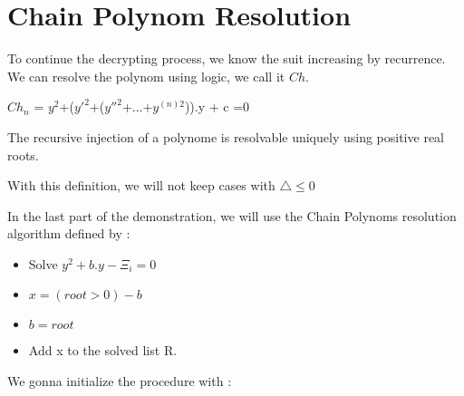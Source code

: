 \documentclass{article}
\begin{document}
\section*{Chain Polynom Resolution}

To continue the decrypting process, we know the suit increasing by recurrence.
We can resolve the polynom using logic, we call it $Ch$.

\begin{center}
	$Ch_{n}$ = $y^{2}$+($y'^{2}$+($y''^{2}$+...+$y^{(n)2}$)).y + c =0
\end{center}
The recursive injection of a polynome is resolvable uniquely using positive real roots.

With this definition, we will not keep cases with $\triangle \leq 0 $ 

In the last part of the demonstration, we will use the Chain Polynoms resolution algorithm defined by :
\begin{itemize}
	\item Solve $ y^{2}+b.y-\Xi_{i}=0$
	\item $x=(root > 0) - b$
	\item $b = root$
	\item Add x to the solved list R.
\end{itemize}
\newpage
We gonna initialize the procedure with :
\end{document}
